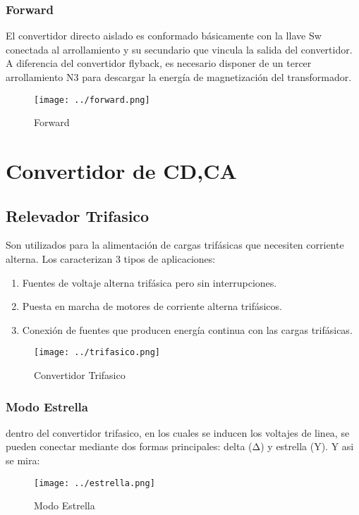 \documentclass[11pt,a4paper]{article}
\begin{document}
\subsubsection{Forward}
El convertidor directo aislado es conformado básicamente con la llave Sw conectada al arrollamiento y su secundario que vincula la salida del convertidor. A diferencia del  convertidor  flyback,  es  necesario  disponer  de  un  tercer  arrollamiento  N3  para  descargar la energía de magnetización del transformador. 

\begin{figure}[h]
\centering
\texttt{[image: ../forward.png]}     
\caption{Forward} 
\end{figure}

\section{Convertidor de CD,CA}

\subsection{Relevador Trifasico}
Son utilizados para la alimentación de cargas trifásicas que necesiten corriente alterna. Los caracterizan 3 tipos de aplicaciones:\begin{enumerate}
\item Fuentes de voltaje alterna trifásica pero sin interrupciones.
\item Puesta en marcha de motores de corriente alterna trifásicos.
\item Conexión de fuentes que producen energía continua con las cargas trifásicas.                     
\end{enumerate}

\begin{figure}[h]
\centering
\texttt{[image: ../trifasico.png]}     
\caption{Convertidor Trifasico} 
\end{figure}

\subsubsection{Modo Estrella}
dentro del convertidor trifasico, en los cuales se inducen los voltajes de linea, se pueden conectar mediante dos formas principales: delta (Δ) y estrella (Y). Y asi se mira:

\begin{figure}[h]
\centering
\texttt{[image: ../estrella.png]}    
\caption{Modo Estrella} 
\end{figure}
\end{document}

